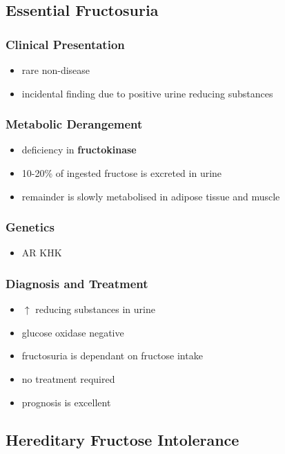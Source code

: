 \documentclass[12pt]{scrartcl}
\begin{document}
\subsection{Essential Fructosuria}
\label{sec:org1ced349}
\subsubsection{Clinical Presentation}
\label{sec:orgdba55f9}
\begin{itemize}
\item rare non-disease
\item incidental finding due to positive urine reducing substances
\end{itemize}
\subsubsection{Metabolic Derangement}
\label{sec:org51612cc}
\begin{itemize}
\item deficiency in \textbf{fructokinase}
\item 10-20\% of ingested fructose is excreted in urine
\item remainder is slowly metabolised in adipose tissue and muscle
\end{itemize}
\subsubsection{Genetics}
\label{sec:org2c03f3a}
\begin{itemize}
\item AR KHK
\end{itemize}
\subsubsection{Diagnosis and Treatment}
\label{sec:org5dd44ba}
\begin{itemize}
\item \(\uparrow\) reducing substances in urine
\item glucose oxidase negative
\item fructosuria is dependant on fructose intake
\item no treatment required
\item prognosis is excellent
\end{itemize}

\subsection{Hereditary Fructose Intolerance}
\label{sec:org6eadcdc}
\end{document}
